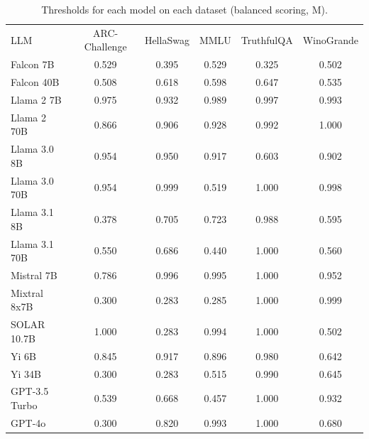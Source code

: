 \begin{table}[h]
\caption{Thresholds for each model on each dataset (balanced scoring, M). }
\label{tab:thresholds_prob_max_k20_w1}
\centering
\begin{tabular}{l S[table-format=3.1] S[table-format=3.1] S[table-format=3.1] S[table-format=3.1] S[table-format=3.1]}
\toprule
LLM & ARC-Challenge & HellaSwag & MMLU & TruthfulQA & WinoGrande \\ 
\cmidrule(lr){1-1} \cmidrule(lr){2-2} \cmidrule(lr){3-3} \cmidrule(lr){4-4} \cmidrule(lr){5-5} \cmidrule(lr){6-6}
Falcon 7B & 0.529 & 0.395 & 0.529 & 0.325 & 0.502\\
Falcon 40B & 0.508 & 0.618 & 0.598 & 0.647 & 0.535\\
Llama 2 7B & 0.975 & 0.932 & 0.989 & 0.997 & 0.993\\
Llama 2 70B & 0.866 & 0.906 & 0.928 & 0.992 & 1.000\\
Llama 3.0 8B & 0.954 & 0.950 & 0.917 & 0.603 & 0.902\\
Llama 3.0 70B & 0.954 & 0.999 & 0.519 & 1.000 & 0.998\\
Llama 3.1 8B & 0.378 & 0.705 & 0.723 & 0.988 & 0.595\\
Llama 3.1 70B & 0.550 & 0.686 & 0.440 & 1.000 & 0.560\\
Mistral 7B & 0.786 & 0.996 & 0.995 & 1.000 & 0.952\\
Mixtral 8x7B & 0.300 & 0.283 & 0.285 & 1.000 & 0.999\\
SOLAR 10.7B & 1.000 & 0.283 & 0.994 & 1.000 & 0.502\\
Yi 6B & 0.845 & 0.917 & 0.896 & 0.980 & 0.642\\
Yi 34B & 0.300 & 0.283 & 0.515 & 0.990 & 0.645\\
GPT-3.5 Turbo & 0.539 & 0.668 & 0.457 & 1.000 & 0.932\\
GPT-4o & 0.300 & 0.820 & 0.993 & 1.000 & 0.680\\
\bottomrule
\end{tabular}
\end{table}

